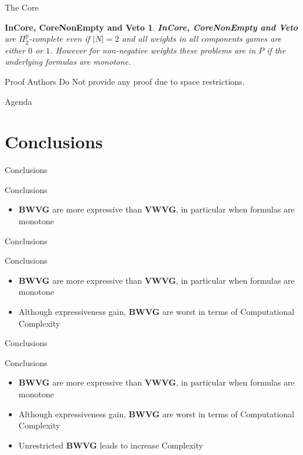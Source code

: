 \documentclass{beamer}
\begin{document}
\begin{frame}[fragile]{The Core}
  \newtheorem{theorem7}{InCore, CoreNonEmpty and Veto}
  \begin{theorem7}
    \textbf{InCore, CoreNonEmpty and Veto} are $\Pi_2^p$-complete even if $|N| = 2$ and all weights in all components games are either $0$ or $1$.
    However for non-negative weights these problems are in $P$ if the underlying formulas are monotone.
  \end{theorem7}
  \begin{block}{Proof}
    Authors Do Not provide any proof due to space restrictions.
  \end{block}
\end{frame}

\begin{frame}[fragile]{Agenda}
  \section{Conclusions}
  \tableofcontents[currentsection]
\end{frame}

\begin{frame}[fragile]{Conclusions}
  \begin{block}{Conclusions}
    \begin{itemize}
      \item \textbf{BWVG} are more expressive than \textbf{VWVG}, in particular when formulas are monotone
    \end{itemize}
  \end{block}
\end{frame}

\begin{frame}[fragile]{Conclusions}
  \begin{block}{Conclusions}
    \begin{itemize}
      \item \textbf{BWVG} are more expressive than \textbf{VWVG}, in particular when formulas are monotone
      \item Although expressiveness gain, \textbf{BWVG} are worst in terms of Computational Complexity
    \end{itemize}
  \end{block}
\end{frame}

\begin{frame}[fragile]{Conclusions}
  \begin{block}{Conclusions}
    \begin{itemize}
      \item \textbf{BWVG} are more expressive than \textbf{VWVG}, in particular when formulas are monotone
      \item Although expressiveness gain, \textbf{BWVG} are worst in terms of Computational Complexity
      \item Unrestricted \textbf{BWVG} leads to increase Complexity
    \end{itemize}
  \end{block}
\end{frame}
\end{document}
